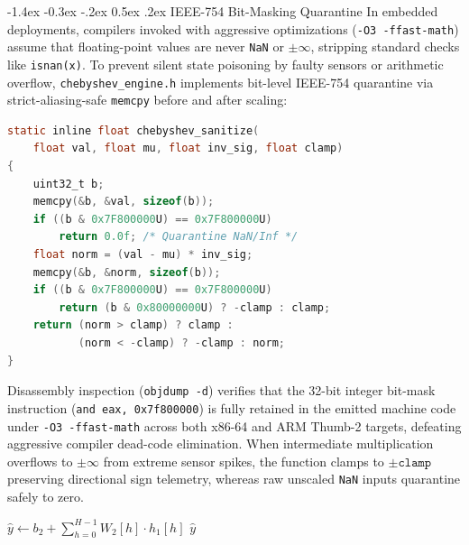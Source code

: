 \documentclass[10pt,twocolumn,a4paper]{article}
\makeatletter
\renewcommand\subsection{\@startsection{subsection}{2}{\z@}%
  {-1.4ex \@plus -0.3ex \@minus -.2ex}%
  {0.5ex \@plus .2ex}%
  {\normalfont\normalsize\bfseries}}
\theoremstyle{plain}
\theoremstyle{definition}
\makeatother
\begin{document}
\subsection{IEEE-754 Bit-Masking Quarantine}
In embedded deployments, compilers invoked with aggressive optimizations (\texttt{-O3 -ffast-math}) assume that floating-point values are never \texttt{NaN} or $\pm\infty$, stripping standard checks like \texttt{isnan(x)}. To prevent silent state poisoning by faulty sensors or arithmetic overflow, \texttt{chebyshev\_engine.h} implements bit-level IEEE-754 \cite{ieee754} quarantine via strict-aliasing-safe \texttt{memcpy} before and after scaling:
\begin{lstlisting}[language=C]
static inline float chebyshev_sanitize(
    float val, float mu, float inv_sig, float clamp)
{
    uint32_t b;
    memcpy(&b, &val, sizeof(b));
    if ((b & 0x7F800000U) == 0x7F800000U)
        return 0.0f; /* Quarantine NaN/Inf */
    float norm = (val - mu) * inv_sig;
    memcpy(&b, &norm, sizeof(b));
    if ((b & 0x7F800000U) == 0x7F800000U)
        return (b & 0x80000000U) ? -clamp : clamp;
    return (norm > clamp) ? clamp :
           (norm < -clamp) ? -clamp : norm;
}
\end{lstlisting}
Disassembly inspection (\texttt{objdump -d}) verifies that the 32-bit integer bit-mask instruction (\texttt{and eax, 0x7f800000}) is fully retained in the emitted machine code under \texttt{-O3 -ffast-math} across both x86-64 and ARM Thumb-2 targets, defeating aggressive compiler dead-code elimination. When intermediate multiplication overflows to $\pm\infty$ from extreme sensor spikes, the function clamps to $\pm\texttt{clamp}$ preserving directional sign telemetry, whereas raw unscaled \texttt{NaN} inputs quarantine safely to zero.

\begin{algorithm}[t]
\caption{Real-Time C99 Bare-Metal Streaming Step}
\label{alg:c99_step}
$\hat{y} \gets b_2 + \sum_{h=0}^{H-1} W_2[h] \cdot h_1[h]$\;
\Return $\hat{y}$\;
\end{algorithm}
\end{document}
